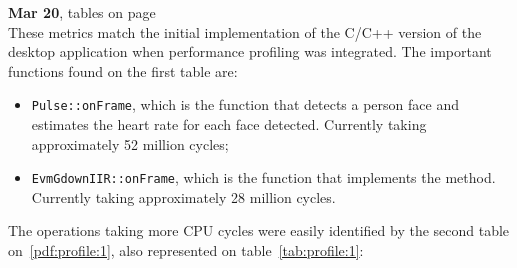 \begin{description}
  \item \textbf{Mar 20}, tables on page~\pageref{pdf:profile:1}\hfill\\
        These metrics match the initial implementation of the C/C++ version
        of the desktop application when performance profiling was integrated.
        The important functions found on the first table are:

        \begin{itemize}
          \item \texttt{Pulse::onFrame}, which is the function that detects a
                person face and estimates the heart rate for each face detected.
                Currently taking approximately 52 million cycles;
          \item \texttt{EvmGdownIIR::onFrame}, which is the function that
                implements the \evm{} method. Currently taking approximately
                28 million cycles.
        \end{itemize}

        The operations taking more CPU cycles were easily identified by the
        second table on~\ref{pdf:profile:1}, also represented on
        table~\ref{tab:profile:1}:


\end{description}
